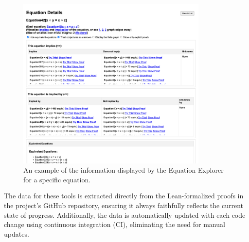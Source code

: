 \begin{figure}
  \centering
  \includegraphics[width=0.85\textwidth]{GUI-equation-explorer.png}
  \caption{An example of the information displayed by the Equation Explorer for a specific equation.}
  \label{fig:screenshot-equation-explorer}
\end{figure}

The data for these tools is extracted directly from the Lean-formalized proofs in the project's GitHub repository, ensuring it always faithfully reflects the current state of progress. Additionally, the data is automatically updated with each code change using continuous integration (CI), eliminating the need for manual updates.
